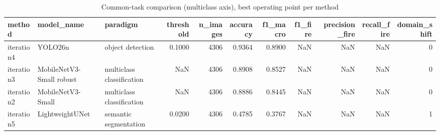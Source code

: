 \begin{table}
\caption{Common-task comparison (multiclass axis), best operating point per method}
\begin{tabular}{lllrrrrrrrr}
\toprule
method & model\_name & paradigm & threshold & n\_images & accuracy & f1\_macro & f1\_fire & precision\_fire & recall\_fire & domain\_shift \\
\midrule
iteration4 & YOLO26n & object detection & 0.1000 & 4306 & 0.9364 & 0.8900 & NaN & NaN & NaN & 0 \\
iteration3 & MobileNetV3-Small robust & multiclass classification & NaN & 4306 & 0.8908 & 0.8527 & NaN & NaN & NaN & 0 \\
iteration2 & MobileNetV3-Small & multiclass classification & NaN & 4306 & 0.8886 & 0.8445 & NaN & NaN & NaN & 0 \\
iteration5 & LightweightUNet & semantic segmentation & 0.0200 & 4306 & 0.4785 & 0.3767 & NaN & NaN & NaN & 1 \\
\bottomrule
\end{tabular}
\end{table}

